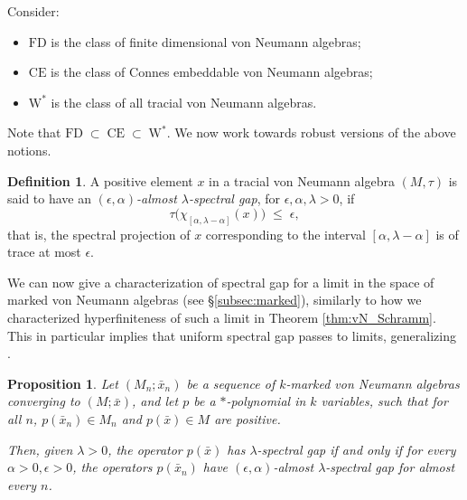 \documentclass[11pt]{amsart}
\newcommand{\cH}{{\mathcal{H}}}
\newtheorem{proposition}[theorem]{Proposition}
\theoremstyle{definition}
\newtheorem{definition}[theorem]{Definition}
\theoremstyle{remark}
\theoremstyle{definition}
\begin{document}
Consider:
\begin{itemize}
  \item \(\mathrm{FD}\) is the class of finite dimensional von Neumann algebras;
  \item \(\mathrm{CE}\) is the class of Connes embeddable von Neumann algebras;
  \item \(\mathrm{W}^*\) is the class of all tracial von Neumann algebras.
\end{itemize}
Note that  $  \mathrm{FD} \;\subset\; \mathrm{CE} \;\subset\; \mathrm{W}^*$.
We now work towards robust versions of the above notions.

\begin{definition}
    A positive element \(x\) in a tracial von Neumann algebra \((M,\tau)\) is said to have an \emph{\((\epsilon,\alpha)\)-almost \(\lambda\)-spectral gap}, for  \(\epsilon, \alpha, \lambda >  0\), if
\[
\tau\bigl(\chi_{[\alpha,\lambda-\alpha]}(x)\bigr) \;\le\; \epsilon,
\]
that is,  the spectral projection of $x$ corresponding to the interval $[\alpha,\lambda-\alpha]$ is of trace at most $\epsilon$. 
\end{definition}

We can now give a characterization of spectral gap for a limit in the space of marked von Neumann algebras (see \S\ref{subsec:marked}), similarly to how we characterized hyperfiniteness of such a limit in Theorem \ref{thm:vN_Schramm}. 
This in particular implies that uniform spectral gap passes to limits, generalizing \cite{levit2023spectral}.

\begin{proposition}\label{prop:spec_gap_pass_to_limit}
Let $(M_n;\bar x_n)$ be a sequence of $k$-marked von Neumann algebras converging to $(M;\bar x)$, and let $p$ be a $*$-polynomial in $k$ variables, such that for all $n$, $p(\bar{x}_n) \in M_n$ and $p(\bar x)\in M$ are positive.

Then, given $\lambda > 0$, the operator $p(\bar x)$ has $\lambda$-spectral gap if and only if for every $\alpha > 0, \epsilon > 0$, the operators $p(\bar x_n)$ have $(\epsilon, \alpha)$-almost $\lambda$-spectral gap for almost every $n$.
\end{proposition}
\end{document}
